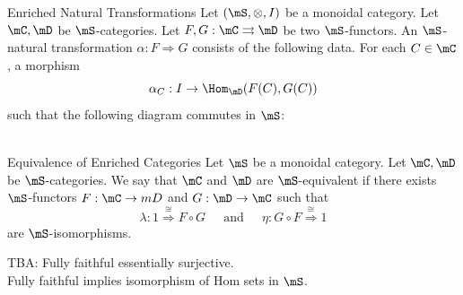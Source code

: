 \documentclass[a4paper]{article}
\begin{document}
\begin{defn}{Enriched Natural Transformations}{} Let $(\mS,\otimes,I)$ be a monoidal category. Let $\mC,\mD$ be $\mS$-categories. Let $F,G:\mC\rightrightarrows\mD$ be two $\mS$-functors. An $\mS$-natural transformation $\alpha:F\Rightarrow G$ consists of the following data. For each $C\in\mC$, a morphism $$\alpha_C:I\to\Hom_\mD(F(C),G(C))$$ such that the following diagram commutes in $\mS$: \\
\\
\end{defn}

\begin{defn}{Equivalence of Enriched Categories}{} Let $\mS$ be a monoidal category. Let $\mC,\mD$ be $\mS$-categories. We say that $\mC$ and $\mD$ are $\mS$-equivalent if there exists $\mS$-functors $F:\mC\to mD$ and $G:\mD\to\mC$ such that $$\lambda:1\overset{\cong}{\Rightarrow}F\circ G\;\;\;\;\text{ and }\;\;\;\;\eta:G\circ F\overset{\cong}{\Rightarrow}1$$ are $\mS$-isomorphisms. 
\end{defn}

TBA: Fully faithful essentially surjective. \\

Fully faithful implies isomorphism of Hom sets in $\mS$. 
\end{document}
